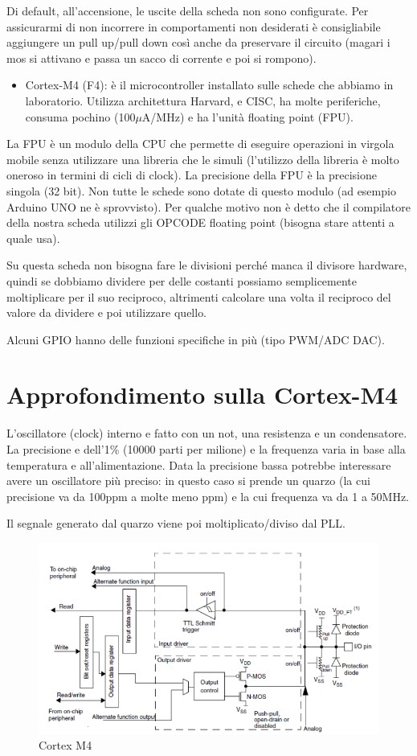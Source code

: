 \documentclass[
]{book}
\providecommand{\tightlist}{%
  \setlength{\itemsep}{0pt}\setlength{\parskip}{0pt}}
\begin{document}
Di default, all'accensione, le uscite della scheda non sono configurate.
Per assicurarmi di non incorrere in comportamenti non desiderati è
consigliabile aggiungere un pull up/pull down così anche da preservare
il circuito (magari i mos si attivano e passa un sacco di corrente e poi
si rompono).

\begin{itemize}
\tightlist
\item
  Cortex-M4 (F4): è il microcontroller installato sulle schede che
  abbiamo in laboratorio. Utilizza architettura Harvard, e CISC, ha
  molte periferiche, consuma pochino (100\(\mu\)A/MHz) e ha l'unità
  floating point (FPU).
\end{itemize}

La FPU è un modulo della CPU che permette di eseguire operazioni in
virgola mobile senza utilizzare una libreria che le simuli (l'utilizzo
della libreria è molto oneroso in termini di cicli di clock). La
precisione della FPU è la precisione singola (32 bit). Non tutte le
schede sono dotate di questo modulo (ad esempio Arduino UNO ne è
sprovvisto). Per qualche motivo non è detto che il compilatore della
nostra scheda utilizzi gli OPCODE floating point (bisogna stare attenti
a quale usa).

Su questa scheda non bisogna fare le divisioni perché manca il divisore
hardware, quindi se dobbiamo dividere per delle costanti possiamo
semplicemente moltiplicare per il suo reciproco, altrimenti calcolare
una volta il reciproco del valore da dividere e poi utilizzare quello.

Alcuni GPIO hanno delle funzioni specifiche in più (tipo PWM/ADC DAC).

\section{Approfondimento sulla
Cortex-M4}\label{approfondimento-sulla-cortex-m4}

L'oscillatore (clock) interno e fatto con un not, una resistenza e un
condensatore. La precisione e dell'1\% (10000 parti per milione) e la
frequenza varia in base alla temperatura e all'alimentazione. Data la
precisione bassa potrebbe interessare avere un oscillatore più preciso:
in questo caso si prende un quarzo (la cui precisione va da 100ppm a
molte meno ppm) e la cui frequenza va da 1 a 50MHz.

Il segnale generato dal quarzo viene poi moltiplicato/diviso dal PLL.

\begin{figure}
\centering
\includegraphics[width=0.5\linewidth,height=\textheight,keepaspectratio]{immagini/50.png}
\caption{Cortex M4}
\end{figure}
\end{document}
